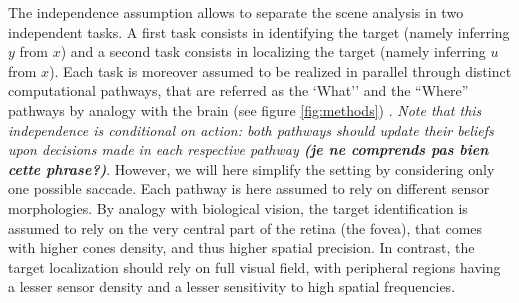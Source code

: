 The independence assumption allows to separate the scene analysis in two independent tasks. A first task consists in identifying the target (namely inferring $y$ from $x$) and a second task consists in localizing the target (namely inferring $u$ from $x$). Each task is moreover assumed to be realized in parallel through distinct computational pathways, that are referred as the
`What'' and the ``Where'' pathways by analogy with the brain (see figure \ref{fig:methods})\ICANN
{}. \emph{Note that %
this independence is conditional on action: both pathways should update their beliefs upon decisions made in each respective pathway {\bf (je ne comprends pas bien cette phrase?)}}\fi. However, we will here  simplify the setting by considering only one possible saccade.
\ICANN
\else
Each pathway is here assumed to rely on different sensor morphologies. By analogy with biological vision, the target identification is assumed to rely on the very central part of the retina (the fovea), that comes with higher cones density, and thus higher spatial precision. In contrast, the target localization should rely on full visual field, with peripheral regions having a lesser sensor density and a lesser sensitivity to high spatial frequencies.
\fi

